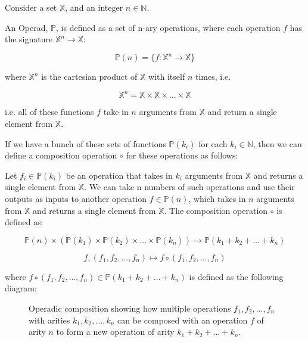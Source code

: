 Consider a set $\mathbb{X}$, and an integer $n \in \mathbb{N}$.

An Operad, $\mathbb{P}$, is defined as a set of n-ary operations, where each operation $f$ has the signature $\mathbb{X}^n \to \mathbb{X}$:

\begin{equation}
  \mathbb{P}(n) = \{f: \mathbb{X}^n \to \mathbb{X}\}
\end{equation}

where $\mathbb{X}^n$ is the cartesian product of $\mathbb{X}$ with itself $n$ times, i.e.

\begin{equation}
  \mathbb{X}^n = \mathbb{X} \times \mathbb{X} \times \ldots \times \mathbb{X}
\end{equation}

i.e. all of these functions $f$ take in $n$ arguments from $\mathbb{X}$ and return a single element from $\mathbb{X}$.

\begin{figure}[h]
\centering
    
\end{figure}

If we have a bunch of these sets of functions $\mathbb{P}(k_i)$ for each $k_i \in \mathbb{N}$, then we can define a composition operation $\circ$ for these operations as follows:

Let $f_i \in \mathbb{P}(k_i)$ be an operation that takes in $k_i$ arguments from $\mathbb{X}$ and returns a single element from $\mathbb{X}$. We can take n numbers of such operations and use their outputs as inputs to another operation $f \in \mathbb{P}(n)$, which takes in $n$ arguments from $\mathbb{X}$ and returns a single element from $\mathbb{X}$. The composition operation $\circ$ is defined as:

\begin{equation}
    \mathbb{P}(n) \times ( \mathbb{P}(k_1) \times \mathbb{P}(k_2) \times \ldots \times \mathbb{P}(k_n) ) \to \mathbb{P}(k_1 + k_2 + \ldots + k_n)
\end{equation}

\begin{equation}
    f, (f_1, f_2, \ldots, f_n) \mapsto f \circ (f_1, f_2, \ldots, f_n)
\end{equation}

where $f \circ (f_1, f_2, \ldots, f_n) \in \mathbb{P}(k_1 + k_2 + \ldots + k_n)$ is defined as the following diagram:

\begin{figure}[h]
\centering

\caption{Operadic composition showing how multiple operations $f_1, f_2, \ldots, f_n$ with arities $k_1, k_2, \ldots, k_n$ can be composed with an operation $f$ of arity $n$ to form a new operation of arity $k_1 + k_2 + \ldots + k_n$.}
\label{fig:operadic-composition}
\end{figure}

